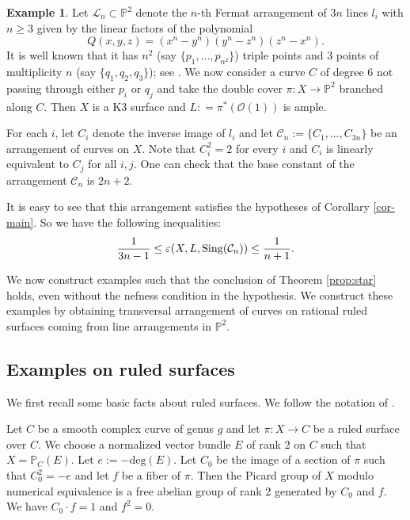 \documentclass[12pt,reqno]{amsart}
\newcommand{\proj}{\mathbb{P}}
\theoremstyle{plain}
\numberwithin{equation}{section}
\theoremstyle{definition}
\newtheorem{example}[theorem]{Example}
\begin{document}
\begin{example}
		Let $\mathcal{L}_n \subset \mathbb{P}^2$ denote the $n$-th Fermat arrangement of $3n$ lines $l_i$ with $n \geq 3$ given by the linear factors of the polynomial 
		\[
		Q(x,y,z)=(x^n-y^n)(y^n-z^n)(z^n-x^n).
		\]
		It is well known that it has $n^2$ (say $\{p_1,\ldots,p_{n^2}\}$) triple points and $3$ points of multiplicity $n$ (say $\{q_1,q_2,q_3\}$); see \cite[Example II.6]{U}.  We now consider a 
		curve $C$ of degree $6$ not passing through either $p_i$ or $q_j$ and take the double cover 
				$\pi : X \longrightarrow \mathbb{P}^2$
		branched along $C$. Then $X$ is a K3 surface  and $L : = \pi^*(\mathcal{O}(1))$ is ample. 

For each $i$, let $C_i$ denote the inverse image of $l_i$ and let 
$\mathcal{C}_n := \{C_1,\ldots, C_{3n}\}$ be an arrangement of curves on $X$. Note that $C_i^2 = 2$ for every $i$ and 
$C_i$ is linearly equivalent to $C_j$ for all $i,j$. 
One can check that the base constant of the arrangement $\mathcal{C}_n$ is $2n+2$. 

It is easy to see that this arrangement satisfies the hypotheses of Corollary \ref{cor-main}. 
So we have the following inequalities:
$$\frac{1}{3n-1} \le \varepsilon(X, L,{\rm Sing}(\mathcal{C}_n)) \le \frac{1}{n+1}.$$



\end{example}




	We now construct examples such that the conclusion of Theorem \ref{prop:star} holds, even without the nefness condition in the hypothesis. We construct these examples by obtaining transversal arrangement of curves on rational ruled surfaces coming from line arrangements in $\mathbb{P}^2.$ 

\subsection{Examples on ruled surfaces}\label{ruled}	
	
	We first recall some basic facts about ruled surfaces. We follow the notation of \cite[Chapter V, Section 2]{Har}.
	
	Let $C$ be a smooth complex curve of genus $g$ and let $\pi: X \to C$ be a ruled surface over $C$. We choose a normalized vector bundle $E$ of rank 2 on $C$ such that $X = \proj_C(E)$. Let $e :=-\text{deg}(E)$. Let $C_0$ be the image of a section of $\pi$ such that $C_0^2 = -e$ and let $f$ be a fiber of $\pi$. Then the Picard group of $X$ modulo numerical equivalence is a free abelian group of rank 2 generated by $C_0$ and $f$. We have $C_0\cdot f=1$ and $f^2 =0$.  
	
\end{document}
